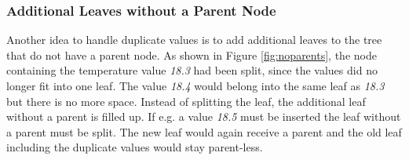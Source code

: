 \documentclass[abstracton,12pt]{scrreprt}
\begin{document}
\subsubsection{Additional Leaves without a Parent Node}
\label{Additional Leaves}
Another idea to handle duplicate values is to add additional leaves to the tree that do not have a parent node. As shown in Figure \ref{fig:noparents}, the node containing the temperature value \emph{18.3} had been split, since the values did no longer fit into one leaf. The value \emph{18.4} would belong into the same leaf as \emph{18.3} but there is no more space. Instead of splitting the leaf, the additional leaf without a parent is filled up. If e.g. a value \emph{18.5} must be inserted the leaf without a parent must be split. The new leaf would again receive a parent and the old leaf including the duplicate values would stay parent-less. \\
\end{document}
